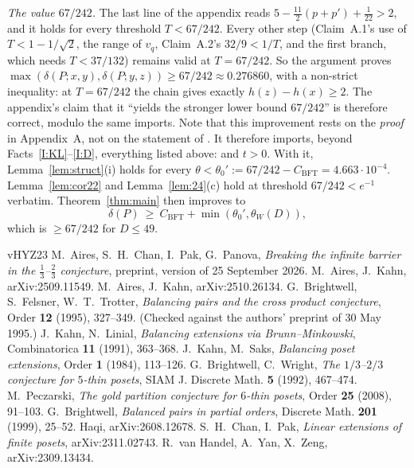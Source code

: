 \documentclass[10pt]{amsart}
\theoremstyle{definition}
\theoremstyle{remark}
\newcommand{\CB}{C_{\mathrm{BFT}}}
\newcommand{\tW}{\theta_W}
\begin{document}
\emph{The value $67/242$.} The last line of the appendix reads $5-\frac{11}{2}(p+p')+\frac1{22}>2$, and it holds for every threshold $T<67/242$.
Every other step (Claim~A.1's use of $T<1-1/\sqrt2$, the range of $v_q$, Claim~A.2's $32/9<1/T$, and the first branch, which needs $T<37/132$) remains valid at $T=67/242$.
So the argument proves $\max(\delta(P;x,y),\delta(P;y,z))\ge 67/242\approx0.276860$, with a non-strict inequality: at $T=67/242$ the chain gives exactly $h(z)-h(x)\ge2$.
The appendix's claim that it ``yields the stronger lower bound $67/242$'' is therefore correct, modulo the same imports.
Note that this improvement rests on the \emph{proof} in Appendix~A, not on the statement of \cite[Lemma~2.3]{KSBFT}. It therefore imports, beyond Facts~\ref{I:KL}--\ref{I:D}, everything listed above: \cite[Lemmas~2.1, 2.2, 2.3, 6.1, 6.2]{BFT95} and $t>0$.
With it, Lemma~\ref{lem:struct}(i) holds for every $\theta<\theta_0':=67/242-\CB=4.663\cdot10^{-4}$. Lemma~\ref{lem:cor22} and Lemma~\ref{lem:24}(c) hold at threshold $67/242<e^{-1}$ verbatim.
Theorem~\ref{thm:main} then improves to
\[
\delta(P)\ \ge\ \CB+\min(\theta_0',\tW(D)),
\]
which is $\ge 67/242$ for $D\le49$.

\begin{thebibliography}{vHYZ23}
 M.~Aires, S.~H.~Chan, I.~Pak, G.~Panova, \emph{Breaking the infinite barrier in the $\frac13$--$\frac23$ conjecture}, preprint, version of 25 September 2026.
 M.~Aires, J.~Kahn, arXiv:2509.11549.
 M.~Aires, J.~Kahn, arXiv:2510.26134.
 G.~Brightwell, S.~Felsner, W.~T.~Trotter, \emph{Balancing pairs and the cross product conjecture}, Order \textbf{12} (1995), 327--349. (Checked against the authors' preprint of 30 May 1995.)
 J.~Kahn, N.~Linial, \emph{Balancing extensions via Brunn--Minkowski}, Combinatorica \textbf{11} (1991), 363--368.
 J.~Kahn, M.~Saks, \emph{Balancing poset extensions}, Order \textbf{1} (1984), 113--126.
 G.~Brightwell, C.~Wright, \emph{The $1/3$--$2/3$ conjecture for $5$-thin posets}, SIAM J. Discrete Math. \textbf{5} (1992), 467--474.
 M.~Peczarski, \emph{The gold partition conjecture for $6$-thin posets}, Order \textbf{25} (2008), 91--103.
 G.~Brightwell, \emph{Balanced pairs in partial orders}, Discrete Math. \textbf{201} (1999), 25--52.
 Haqi, arXiv:2608.12678.
 S.~H.~Chan, I.~Pak, \emph{Linear extensions of finite posets}, arXiv:2311.02743.
 R.~van Handel, A.~Yan, X.~Zeng, arXiv:2309.13434.
\end{thebibliography}
\end{document}
